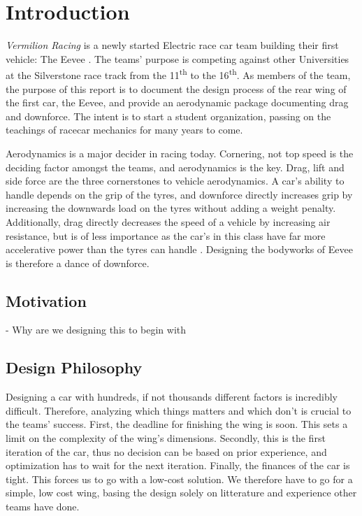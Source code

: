 \chapter{Introduction}

\emph{Vermilion Racing} is a newly started Electric race car team building their first vehicle: The Eevee \cite{bulba}. The teams' purpose is competing against other Universities at the Silverstone race track from the 11\textsuperscript{th} to the 16\textsuperscript{th}. As members of the team, the purpose of this report is to document the design process of the rear wing of the first car, the Eevee, and provide an aerodynamic package documenting drag and downforce. The intent is to start a student organization, passing on the teachings of racecar mechanics for many years to come.

Aerodynamics is a major decider in racing today. Cornering, not top speed is the deciding factor amongst the teams, and aerodynamics is the key. Drag, lift and side force are the three cornerstones to vehicle aerodynamics. A car's ability to handle depends on the grip of the tyres, and downforce directly increases grip by increasing the downwards load on the tyres without adding a weight penalty. Additionally, drag directly decreases the speed of a vehicle by increasing air resistance, but is of less importance as the car's in this class have far more accelerative power than the tyres can handle \cite{jkatz}. Designing the bodyworks of Eevee is therefore a dance of downforce.



\section{Motivation}
- Why are we designing this to begin with

\section{Design Philosophy}


Designing a car with hundreds, if not thousands different factors is incredibly difficult. Therefore, analyzing which things matters and which don't is crucial to the teams' success. First, the deadline for finishing the wing is soon. This sets a limit on the complexity of the wing's dimensions. Secondly, this is the first iteration of the car, thus no decision can be based on prior experience, and optimization has to wait for the next iteration. Finally, the finances of the car is tight. This forces us to go with a low-cost solution. We therefore have to go for a simple, low cost wing, basing the design solely on litterature and experience other teams have done.

